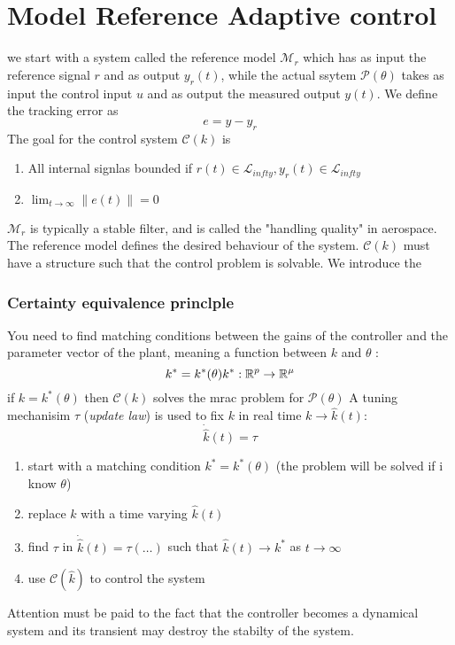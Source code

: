 \documentclass{book}
\begin{document}
\section{Model Reference Adaptive control}
we start with a system called the reference model $\mathcal{M}_r$
which has as input the reference signal $r$ and as output $y_r(t)$, while the actual ssytem $\mathcal{P}(\theta)$ takes as input the control input $u$ and as output the measured output $y(t)$. We define the tracking error as 
\[
    e=y-y_r
\]
The goal for the control system $\mathcal{C}(k)$ is 
\begin{enumerate}
    \item All internal signlas bounded if $r(t)\in \mathcal{L}_{infty}, y_r(t)\in \mathcal{L}_{infty}$
    \item $\lim_{t\to\infty}\|e(t)\|=0$
\end{enumerate}
$\mathcal{M}_r$ is typically a stable filter, and is called the "handling quality" in aerospace. The reference model defines the desired behaviour of the system. 
$\mathcal{C}(k)$ must have a structure such that the control problem is solvable. We introduce the 
\subsubsection{Certainty equivalence princlple}
You need to find matching conditions between the gains of the controller and the parameter vector of the plant, meaning a function between $k$ and $\theta$ : 
\[
    k^*=k^*(\theta) \\
    k^*:\mathbb{R}^p \to \mathbb{R}^\mu
\]
if $k=k^*(\theta)$ then $\mathcal{C}(k)$ solves the mrac problem for $\mathcal{P}(\theta)$
A tuning mechanisim $\tau$ (\emph{update law}) is used to fix $k$ in real time $k\to\hat{k}(t)$: 
\[
    \dot{\hat{k}}(t)=\tau
\]
\begin{enumerate}
    \item start with a matching condition $k^*=k^*(\theta)$ (the problem will be solved if i know $\theta$) 
    \item replace $k$ with a time varying $\hat{k}(t)$ 
    \item find $\tau$ in $\dot{\hat{k}}(t)=\tau(\dots)$ such that $\hat{k}(t)\to k^*$ as $t\to\infty$
    \item use $\mathcal{C}(\hat{k})$ to control the system
\end{enumerate}
Attention must be paid to the fact that the controller becomes a dynamical system and its transient may destroy the stabilty of the system. 
\end{document}
